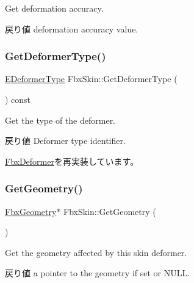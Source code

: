 Get deformation accuracy. \begin{DoxyReturn}{戻り値}
deformation accuracy value. 
\end{DoxyReturn}
\mbox{\label{class_fbx_skin_abaf5fca14c0e8339ea692560fbd494d8}} 
\subsubsection{\texorpdfstring{Get\+Deformer\+Type()}{GetDeformerType()}}
{\footnotesize\ttfamily \hyperlink{class_fbx_deformer_a07e2cfb767191ba5c8799fdfbfe3eaf6}{E\+Deformer\+Type} Fbx\+Skin\+::\+Get\+Deformer\+Type (\begin{DoxyParamCaption}{ }\end{DoxyParamCaption}) const\hspace{0.3cm}{\ttfamily [virtual]}}

Get the type of the deformer. \begin{DoxyReturn}{戻り値}
Deformer type identifier. 
\end{DoxyReturn}


\hyperlink{class_fbx_deformer_adbc586e383f788f24d7fce9ed859d481}{Fbx\+Deformer}を再実装しています。

\mbox{\label{class_fbx_skin_a982b88b989530a1ccb3cca6543c59f9c}} 
\subsubsection{\texorpdfstring{Get\+Geometry()}{GetGeometry()}}
{\footnotesize\ttfamily \hyperlink{class_fbx_geometry}{Fbx\+Geometry}$\ast$ Fbx\+Skin\+::\+Get\+Geometry (\begin{DoxyParamCaption}{ }\end{DoxyParamCaption})}

Get the geometry affected by this skin deformer. \begin{DoxyReturn}{戻り値}
a pointer to the geometry if set or N\+U\+LL. 
\end{DoxyReturn}
\mbox{\label{class_fbx_skin_acd5153c9c43d4a4a659121c4142576ba}} 
